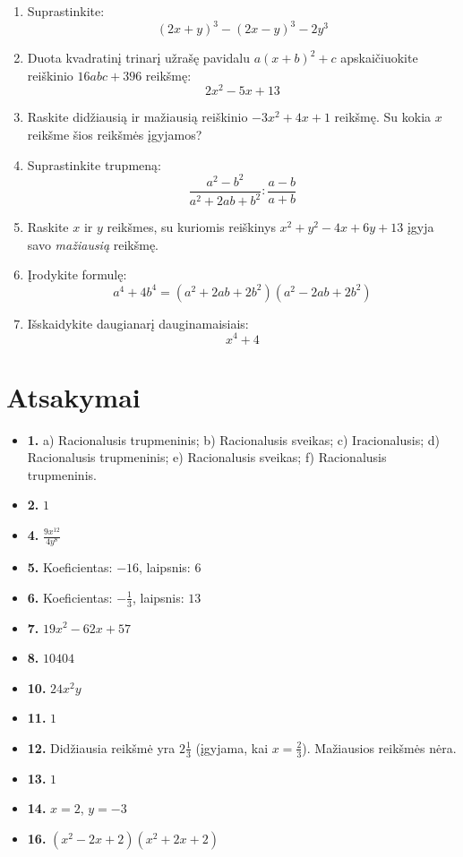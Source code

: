 \documentclass[12pt,a4paper]{article}
\begin{document}
\begin{enumerate}
    \item Suprastinkite:
    $$ (2x+y)^3 - (2x-y)^3 - 2y^3 $$

    \item Duota kvadratinį trinarį užrašę pavidalu $a(x+ b)^2 + c$ apskaičiuokite reiškinio $16abc+396$ reikšmę:
    $$ 2x^2 - 5x + 13 $$


    \item Raskite didžiausią ir mažiausią reiškinio $-3x^2 + 4x + 1$ reikšmę. Su kokia $x$ reikšme šios reikšmės įgyjamos?

    \item Suprastinkite trupmeną:
    $$\frac{a^2 - b^2}{a^2 + 2ab + b^2} : \frac{a-b}{a+b}$$

    \item Raskite $x$ ir $y$ reikšmes, su kuriomis reiškinys $x^2 + y^2 - 4x + 6y + 13$ įgyja savo \textit{mažiausią} reikšmę.

    \item Įrodykite formulę:
    $$a^4+4 b^4=\left(a^2+2 a b+2 b^2\right)\left(a^2-2 a b+2 b^2\right)$$

    \item Išskaidykite daugianarį dauginamaisiais:
    $$ x^4 + 4 $$
\end{enumerate}

\newpage
\section*{Atsakymai}

\begin{itemize}[label=]
    \item \textbf{1.} a) Racionalusis trupmeninis; b) Racionalusis sveikas; c) Iracionalusis; d) Racionalusis trupmeninis; e) Racionalusis sveikas; f) Racionalusis trupmeninis.
    \item \textbf{2.} $1$
    \item \textbf{4.} $\displaystyle \frac{9x^{12}}{4y^8}$
    \item \textbf{5.} Koeficientas: $-16$, laipsnis: $6$
    \item \textbf{6.} Koeficientas: $-\frac{1}{3}$, laipsnis: $13$
    \item \textbf{7.} $19x^2 - 62x + 57$
    \item \textbf{8.} $10404$
    \item \textbf{10.} $24x^2y$
    \item \textbf{11.} $1$
    \item \textbf{12.} Didžiausia reikšmė yra $2\frac{1}{3}$ (įgyjama, kai $x = \frac{2}{3}$). Mažiausios reikšmės nėra.
    \item \textbf{13.} $1$
    \item \textbf{14.} $x = 2$, $y = -3$
    \item \textbf{16.} $(x^2 - 2x + 2)(x^2 + 2x + 2)$
\end{itemize}
\end{document}
